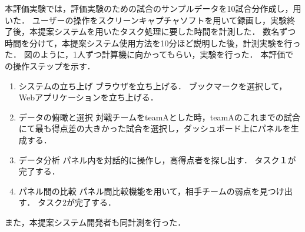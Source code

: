 \documentclass[sotsuron]{kuee}
\begin{document}
					本評価実験では，評価実験のための試合のサンプルデータを10試合分作成し，用いた．
					ユーザーの操作をスクリーンキャプチャソフトを用いて録画し，実験終了後，本提案システムを用いたタスク処理に要した時間を計測した．
					数名ずつ時間を分けて，本提案システム使用方法を10分ほど説明した後，計測実験を行った．
					図のように，1人ずつ計算機に向かってもらい，実験を行った．
					本評価での操作ステップを示す．
					\begin{enumerate}
						\item システムの立ち上げ
							ブラウザを立ち上げる．
							ブックマークを選択して，Webアプリケーションを立ち上げる．
						\item データの俯瞰と選択
							対戦チームをteamAとした時，teamAのこれまでの試合にて最も得点差の大きかった試合を選択し，ダッシュボード上にパネルを生成する．
						\item データ分析
							パネル内を対話的に操作し，高得点者を探し出す．
							タスク１が完了する．
						\item パネル間の比較
							パネル間比較機能を用いて，相手チームの弱点を見つけ出す．
							タスク2が完了する．
					\end{enumerate}
					また，本提案システム開発者も同計測を行った．
\end{document}
